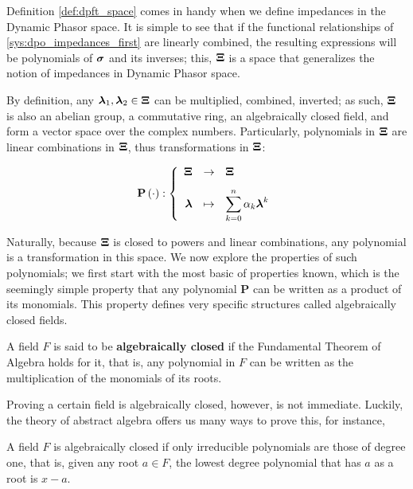 	Definition \ref{def:dpft_space} comes in handy when we define impedances in the Dynamic Phasor space. It is simple to see that if the functional relationships of \eqref{sys:dpo_impedances_first} are linearly combined, the resulting expressions will be polynomials of $\boldsymbol{\sigma}$ and its inverses; this, $\boldsymbol{\Xi}$ is a space that generalizes the notion of impedances in Dynamic Phasor space. 

	By definition, any $\boldsymbol{\lambda}_1,\boldsymbol{\lambda}_2\in\boldsymbol{\Xi}$ can be multiplied, combined, inverted; as such, $\boldsymbol{\Xi}$ is also an abelian group, a commutative ring, an algebraically closed field, and form a vector space over the complex numbers. Particularly, polynomials in $\boldsymbol{\Xi}$ are linear combinations in $\boldsymbol{\Xi}$, thus transformations in $\boldsymbol{\Xi}$:

\begin{equation} \mathbf{P}\left(\cdot\right): \left\{\begin{array}{rcl} \boldsymbol{\Xi} &\to& \boldsymbol{\Xi} \\[3mm] \boldsymbol{\lambda} &\mapsto& \displaystyle\sum_{k=0}^n \alpha_k \boldsymbol{\lambda}^{k} \end{array}\right. \label{eq:dpfs_poly_def}\end{equation}

	Naturally, because $\boldsymbol{\Xi}$ is closed to powers and linear combinations, any polynomial is a transformation in this space. We now explore the properties of such polynomials; we first start with the most basic of properties known, which is the seemingly simple property that any polynomial $\mathbf{P}$ can be written as a product of its monomials. This property defines very specific structures called algebraically closed fields.

\begin{definition}
	A field $F$ is said to be \textbf{algebraically closed} if the Fundamental Theorem of Algebra holds for it, that is, any polynomial in $F$ can be written as the multiplication of the monomials of its roots.
\end{definition}

	Proving a certain field is algebraically closed, however, is not immediate. Luckily, the theory of abstract algebra offers us many ways to prove this, for instance, 

\begin{theorem}
	A field $F$ is algebraically closed if only irreducible polynomials are those of degree one, that is, given any root $a\in F$, the lowest degree polynomial that has $a$ as a root is $x - a$.
\end{theorem}

